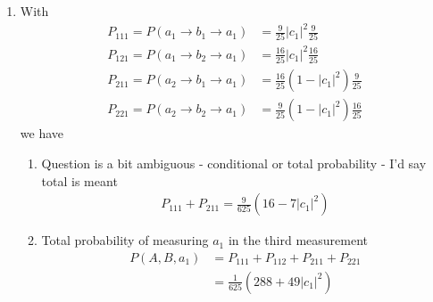 \documentclass{article}
\begin{document}
\begin{enumerate}
\begin{enumerate}
    \item With
    \begin{align}
            P_{111}=P(a_1\rightarrow b_1\rightarrow a_1)&=\frac{9}{25}|c_1|^2\frac{9}{25}\\
            P_{121}=P(a_1\rightarrow b_2\rightarrow a_1)&=\frac{16}{25}|c_1|^2\frac{16}{25}\\
            P_{211}=P(a_2\rightarrow b_1\rightarrow a_1)&=\frac{16}{25}(1-|c_1|^2)\frac{9}{25}\\
            P_{221}=P(a_2\rightarrow b_2\rightarrow a_1)&=\frac{9}{25}(1-|c_1|^2)\frac{16}{25}
    \end{align}
    we have
    \begin{enumerate}
        \item Question is a bit ambiguous - conditional or total probability - I'd say total is meant
        \begin{align}
           P_{111}+P_{211}=\frac{9}{625}(16-7|c_1|^2)
        \end{align}
        \item Total probability of measuring $a_1$ in the third measurement 
        \begin{align}
            P(A,B,a_1)&=P_{111}+P_{112}+P_{211}+P_{221}\\
            &=\frac{1}{625}(288+49|c_1|^2)
        \end{align}
    \end{enumerate}
    

\end{enumerate}
\end{enumerate}
\end{document}
